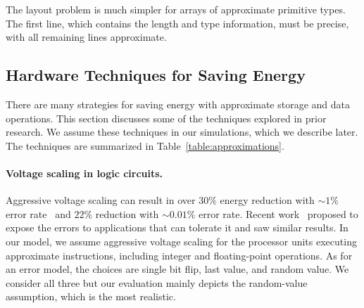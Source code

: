 The layout problem is much simpler for arrays of approximate primitive
types. The first line, which
contains the length and type information, must be precise, with all remaining
lines approximate.


\subsection{Hardware Techniques for Saving Energy }
\label{strategies}





There are many strategies for saving energy with approximate
storage and data operations. This section discusses some of the
techniques explored in prior research. We assume these techniques in
our simulations, which we describe later. The techniques are summarized
in Table~\ref{table:approximations}.


\paragraph{Voltage scaling in logic circuits.} Aggressive voltage
scaling can result in over $30\%$ energy reduction with
$\sim \! 1\%$ error rate~\cite{razor} and $22\%$ reduction with
$\sim \! 0.01\%$ error rate.  Recent work~\cite{hpca10cam,relax} proposed to
expose the errors to applications that can tolerate it and saw similar
results. In our model, we assume aggressive voltage scaling for the
processor units executing approximate instructions,
including integer and floating-point operations. As for an
error model, the choices are single bit flip, last value, and random
value. We consider all three but our evaluation mainly depicts the
random-value assumption, which is the most realistic.

